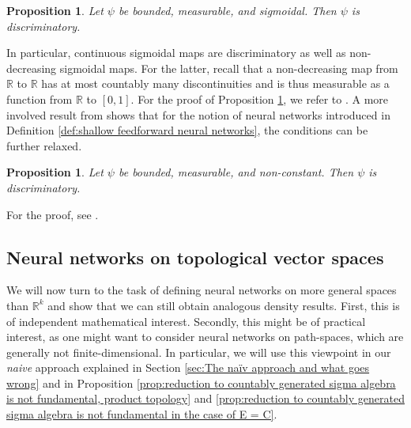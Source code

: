 \documentclass[11pt,a4paper,twoside,openany]{report}
\numberwithin{equation}{section}
\theoremstyle{plain} %
\newtheorem{proposition}[theorem]{Proposition}
\theoremstyle{definition} %
\theoremstyle{remark} %
\let\parencite\authnumparencite
\begin{document}
    \begin{proposition}\label{prop:sigmoidal implies discriminatory}
        Let \(\psi\) be bounded, measurable, and sigmoidal. Then \(\psi\) is discriminatory.
    \end{proposition}
      In particular, continuous sigmoidal maps are discriminatory as well as non-decreasing sigmoidal maps. For the latter, recall that a non-decreasing map from \(\mathbb{R}\) to \(\mathbb{R}\) has at most countably many discontinuities and is thus measurable as a function from \(\mathbb{R}\) to \([0,1]\). 
 For the proof of Proposition \ref{prop:sigmoidal implies discriminatory}, we refer to \parencite[Lemma.~1]{Cybenko1989}.
 A more involved result from \parencite{Hornik1991} shows that for the notion of neural networks introduced in Definition \ref{def:shallow feedforward neural networks}, the conditions can be further relaxed.
 \begin{proposition}\label{prop:non-constant implies discriminatory}
     Let \(\psi\) be bounded, measurable, and non-constant. Then \(\psi\) is discriminatory.
 \end{proposition}
 For the proof, see \parencite[Thm.~5]{Hornik1991}.
\subsection{Neural networks on topological vector spaces}
We will now turn to the task of defining neural networks on more general spaces than \(\mathbb{R}^k\) and show that we can still obtain analogous density results. First, this is of independent mathematical interest. Secondly, this might be of practical interest, as one might want to consider neural networks on path-spaces, which are generally not finite-dimensional. In particular, we will use this viewpoint in our \textit{naive} approach explained in Section \ref{sec:The naïv approach and what goes wrong} and in Proposition \ref{prop:reduction to countably generated sigma algebra is not fundamental, product topology} and \ref{prop:reduction to countably generated sigma algebra is not fundamental in the case of E = C}. 
\end{document}

